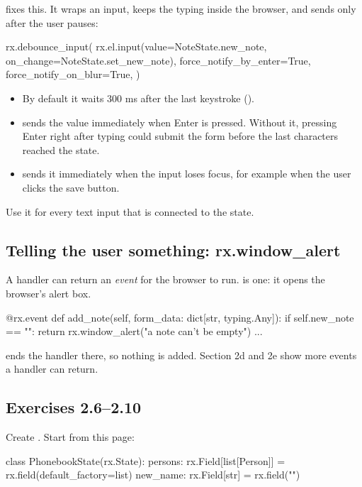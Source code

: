  fixes this. It wraps an input, keeps the typing inside the browser, and sends  only after the user pauses:

\begin{py}
rx.debounce_input(
	rx.el.input(value=NoteState.new_note, on_change=NoteState.set_new_note),
	force_notify_by_enter=True,
	force_notify_on_blur=True,
)
\end{py}

\begin{itemize}
\item By default it waits 300 ms after the last keystroke ().
\item {} sends the value immediately when Enter is pressed. Without it, pressing Enter right after typing could submit the form before the last characters reached the state.
\item {} sends it immediately when the input loses focus, for example when the user clicks the save button.
\end{itemize}

Use it for every text input that is connected to the state.

\subsection{Telling the user something: rx.window\_alert}

A handler can return an \emph{event} for the browser to run.  is one: it opens the browser's alert box.

\begin{py}
@rx.event
def add_note(self, form_data: dict[str, typing.Any]):
	if self.new_note == "":
		return rx.window_alert("a note can't be empty")
	...
\end{py}

 ends the handler there, so nothing is added. Section 2d and 2e show more events a handler can return.

\subsection{Exercises 2.6--2.10}

Create . Start from this page:

\begin{py}
class PhonebookState(rx.State):
	persons: rx.Field[list[Person]] = rx.field(default_factory=list)
	new_name: rx.Field[str] = rx.field("")
\end{py}

